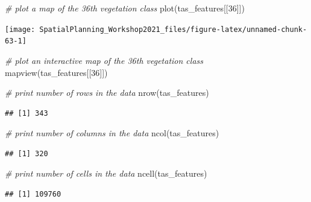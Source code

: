 \documentclass[
  12pt,
]{book}
\newenvironment{Shaded}{\begin{snugshade}}{\end{snugshade}}
\newcommand{\CommentTok}[1]{\textcolor[rgb]{0.56,0.35,0.01}{\textit{#1}}}
\newcommand{\DecValTok}[1]{\textcolor[rgb]{0.00,0.00,0.81}{#1}}
\newcommand{\FunctionTok}[1]{\textcolor[rgb]{0.00,0.00,0.00}{#1}}
\newcommand{\NormalTok}[1]{#1}
\begin{document}
\begin{Shaded}
\begin{Highlighting}[]
\CommentTok{\# plot a map of the 36th vegetation class}
\FunctionTok{plot}\NormalTok{(tas\_features[[}\DecValTok{36}\NormalTok{]])}
\end{Highlighting}
\end{Shaded}

\begin{center}\texttt{[image: SpatialPlanning\_Workshop2021\_files/figure-latex/unnamed-chunk-63-1]} \end{center}

\begin{Shaded}
\begin{Highlighting}[]
\CommentTok{\# plot an interactive map of the 36th vegetation class}
\FunctionTok{mapview}\NormalTok{(tas\_features[[}\DecValTok{36}\NormalTok{]])}
\end{Highlighting}
\end{Shaded}

\begin{Shaded}
\begin{Highlighting}[]
\CommentTok{\# print number of rows in the data}
\FunctionTok{nrow}\NormalTok{(tas\_features)}
\end{Highlighting}
\end{Shaded}

\begin{verbatim}
## [1] 343
\end{verbatim}

\begin{Shaded}
\begin{Highlighting}[]
\CommentTok{\# print number of columns  in the data}
\FunctionTok{ncol}\NormalTok{(tas\_features)}
\end{Highlighting}
\end{Shaded}

\begin{verbatim}
## [1] 320
\end{verbatim}

\begin{Shaded}
\begin{Highlighting}[]
\CommentTok{\# print number of cells in the data}
\FunctionTok{ncell}\NormalTok{(tas\_features)}
\end{Highlighting}
\end{Shaded}

\begin{verbatim}
## [1] 109760
\end{verbatim}
\end{document}
